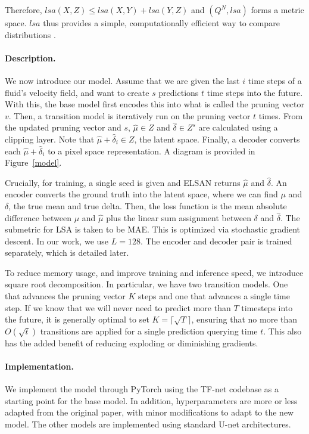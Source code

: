 \documentclass{article}
\begin{document}
Therefore, $lsa(X, Z) \le lsa(X, Y) + lsa(Y, Z)$ and $(Q^N, lsa)$ forms a metric space. $lsa$ thus provides a simple, computationally efficient way to compare distributions \cite{linearsumassignment}.
\paragraph{Description.}
We now introduce our model. Assume that we are given the last $i$ time steps of a fluid's velocity field, and want to create $s$ predictions $t$ time steps into the future. With this, the base model first encodes this into what is called the pruning vector $v$. Then, a transition model is iteratively run on the pruning vector $t$ times. From the updated pruning vector and $s$, $\hat{\mu} \in Z$ and $\hat{\delta} \in Z^{s}$ are calculated using a clipping layer. Note that $\hat{\mu} + \hat{\delta}_i \in Z$, the latent space. Finally, a decoder converts each $\hat{\mu} + \hat{\delta}_i$ to a pixel space representation. A diagram is provided in Figure~\ref{model}.

Crucially, for training, a single seed is given and ELSAN returns $\hat{\mu}$ and $\hat{\delta}$. An encoder converts the ground truth into the latent space, where we can find $\mu$ and $\delta$, the true mean and true delta. Then, the loss function is the mean absolute difference between $\mu$ and $\hat{\mu}$ plus the linear sum assignment between $\delta$ and $\hat{\delta}$. The submetric for LSA is taken to be MAE. This is optimized via stochastic gradient descent. In our work, we use $L = 128$. The encoder and decoder pair is trained separately, which is detailed later.

To reduce memory usage, and improve training and inference speed, we introduce square root decomposition. In particular, we have two transition models. One that advances the pruning vector $K$ steps and one that advances a single time step. If we know that we will never need to predict more than $T$ timesteps into the future, it is generally optimal to set $K = \lceil\sqrt {T}\rceil$, ensuring that no more than $O\left(\sqrt{t}\right)$ transitions are applied for a single prediction querying time $t$. This also has the added benefit of reducing exploding or diminishing gradients.
\paragraph{Implementation.}
We implement the model through PyTorch using the TF-net \cite{Wang2020TF} codebase as a starting point for the base model. In addition, hyperparameters are more or less adapted from the original paper, with minor modifications to adapt to the new model. The other models are implemented using standard U-net architectures.
\end{document}

